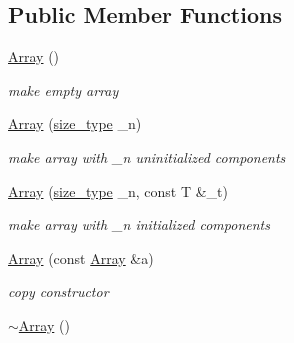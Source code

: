 \subsection*{Public Member Functions}
\begin{DoxyCompactItemize}
\item 
\hypertarget{classhdnum_1_1Array_a8ffcdc4e69b3ddc00d1ec97189436a57}{
\hyperlink{classhdnum_1_1Array_a8ffcdc4e69b3ddc00d1ec97189436a57}{Array} ()}
\label{classhdnum_1_1Array_a8ffcdc4e69b3ddc00d1ec97189436a57}

\begin{DoxyCompactList}\small\item\em make empty array \item\end{DoxyCompactList}\item 
\hypertarget{classhdnum_1_1Array_afa6e185e6b30e1ba0aeecfd86b5997f1}{
\hyperlink{classhdnum_1_1Array_afa6e185e6b30e1ba0aeecfd86b5997f1}{Array} (\hyperlink{classhdnum_1_1Array_a52bad04c045624e4240073f8efb2e8e1}{size\_\-type} \_\-n)}
\label{classhdnum_1_1Array_afa6e185e6b30e1ba0aeecfd86b5997f1}

\begin{DoxyCompactList}\small\item\em make array with \_\-n uninitialized components \item\end{DoxyCompactList}\item 
\hypertarget{classhdnum_1_1Array_ad7c595fddcdf74a8c768fdb3b63b6365}{
\hyperlink{classhdnum_1_1Array_ad7c595fddcdf74a8c768fdb3b63b6365}{Array} (\hyperlink{classhdnum_1_1Array_a52bad04c045624e4240073f8efb2e8e1}{size\_\-type} \_\-n, const T \&\_\-t)}
\label{classhdnum_1_1Array_ad7c595fddcdf74a8c768fdb3b63b6365}

\begin{DoxyCompactList}\small\item\em make array with \_\-n initialized components \item\end{DoxyCompactList}\item 
\hypertarget{classhdnum_1_1Array_a2f537b09e173003db9ef8ab0aa7d465c}{
\hyperlink{classhdnum_1_1Array_a2f537b09e173003db9ef8ab0aa7d465c}{Array} (const \hyperlink{classhdnum_1_1Array}{Array} \&a)}
\label{classhdnum_1_1Array_a2f537b09e173003db9ef8ab0aa7d465c}

\begin{DoxyCompactList}\small\item\em copy constructor \item\end{DoxyCompactList}\item 
\hypertarget{classhdnum_1_1Array_aafee3af74a03d909efa743e39360404c}{
\hyperlink{classhdnum_1_1Array_aafee3af74a03d909efa743e39360404c}{$\sim$Array} ()}
\label{classhdnum_1_1Array_aafee3af74a03d909efa743e39360404c}


\end{DoxyCompactItemize}
